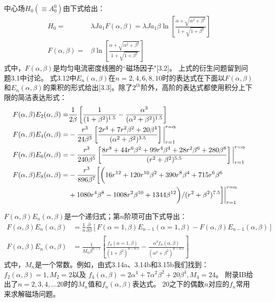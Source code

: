 中心场$H_0(\equiv A_0^0)$由下式给出：
\begin{subequations}\label{eqn:h0}
	\begin{align}
  H_0=&\lambda J a_1 F(\alpha,\beta)=\lambda J a_1 \beta \ln \left[\frac{\alpha+\sqrt{\alpha^2+\beta^2}}{1+\sqrt{1+\beta^2}}\right] \\
  F(\alpha,\beta)=&\beta \ln \left[\frac{\alpha+\sqrt{\alpha^2+\beta^2}}{1+\sqrt{1+\beta^2}}\right]
  	\end{align}
\end{subequations}
式中，$F(\alpha,\beta)$是均匀电流密度线圈的``磁场因子"[3.2]。
上式的衍生问题留到问题3.1中讨论。
式3.12中$E_n (\alpha,\beta)$在$n=2,4,6,8,10$时的表达式在下面以$F(\alpha,\beta)$和$E_n(\alpha,\beta)$的乘积的形式给出[3.3]。除了$2^{th}$阶外，高阶的表达式都使用积分上下限的简洁表达形式：
\begin{subequations}
\begin{align}
F(\alpha,\beta) E_2(\alpha,\beta)=& \frac{1}{2\beta}\left[\frac{1}{(1+\beta^2)^{1.5}}-\frac{\alpha^3}{(\alpha^2+\beta^2)^{1.5}}\right]\\
F(\alpha,\beta)E_4(\alpha,\beta)=&-\frac{r^3}{24\beta^3}\left[\frac{2r^4+7r^2\beta^2+20\beta^4}{(\alpha^2+\beta^2)^{3.5}}\right]\bigg|_{r=1}^{r=\alpha}\\
F(\alpha,\beta)E_6(\alpha,\beta)=&-\frac{r^3}{240\beta^5}\left[\frac{8r^8+44 r^6\beta^2+99 r^4\beta^4+28 r^2 \beta^6+280 \beta^8}{(r^2+\beta^2)^{5.5}}\right]\bigg|_{r=1}^{r=\alpha}\\
F(\alpha,\beta)E_8(\alpha,\beta)=&-\frac{r^3}{896\beta^7}\bigg[\bigg(16 r^{12}+120 r^{10}\beta^2+390r^8\beta^4+715r^6\beta^6\notag\\
&+1080r^4\beta^8-1008r^2\beta^{10}+1344\beta^{12}\bigg)/(r^2+\beta^2)^{7.5}\bigg]\bigg|_{r=1}^{r=\alpha}
\end{align}
\end{subequations}

$F(\alpha,\beta)E_{n}(\alpha,\beta)$是一个递归式；第$n$阶项可由下式导出：
\begin{subequations}
	\begin{align}
F(\alpha,\beta)E_{n}(\alpha,\beta)&=\frac{1}{n} \frac{\partial}{\partial \beta}\left[F(\alpha=1,\beta)E_{n-1}(\alpha=1,\beta)-F(\alpha,\beta)E_{n-1}(\alpha,\beta)\right]\\
F(\alpha,\beta) E_{n}(\alpha,\beta)&=\frac{1}{M_n \beta^{n-1}}\left[\frac{f_n(\alpha=1,\beta)}{(1+\beta^2)^{n-0.5}}-\frac{\alpha^3 f_n(\alpha,\beta)}{(\alpha^2+\beta^2)^{n-0.5}}\right]
\end{align}
\end{subequations}
式中，$M_n$是一个常数。例如，由式3.14a、3.14b和3.15b我们找到：$f_2(\alpha,\beta)=1,M_2=2$以及
$f_4(\alpha,\beta)=2\alpha^4+7\alpha^2\beta^2+20\beta^4,M_4=24$。
附录IB给出了$n=2,3,4,...20$时的$M_n$值和$f_n(\alpha,\beta)$表达式。
20之下的偶数$n$对应的$f_n$常用来求解磁场问题。

